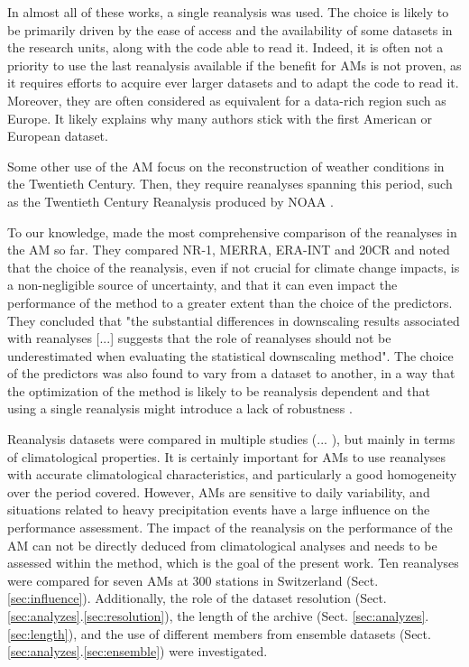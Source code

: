 \documentclass{ametsoc}
\begin{document}
In almost all of these works, a single reanalysis was used. The choice is likely to be primarily driven by the ease of access and the availability of some datasets in the research units, along with the code able to read it. Indeed, it is often not a priority to use the last reanalysis available if the benefit for AMs is not proven, as it requires efforts to acquire ever larger datasets and to adapt the code to read it. Moreover, they are often considered as equivalent for a data-rich region such as Europe. It likely explains why many authors stick with the first American or European dataset.

Some other use of the AM focus on the reconstruction of weather conditions in the Twentieth Century. Then, they require reanalyses spanning this period, such as the Twentieth Century Reanalysis \citep[20CR][]{Compo2011} produced by NOAA \citep[for example,][]{Kuentz2015, Caillouet2016, Brigode2016}. 

To our knowledge, \citet{Dayon2015} made the most comprehensive comparison of the reanalyses in the AM so far. They compared NR-1, MERRA, ERA-INT and 20CR and noted that the choice of the reanalysis, even if not crucial for climate change impacts, is a non-negligible source of uncertainty, and that it can even impact the performance of the method to a greater extent than the choice of the predictors. They concluded that "the substantial differences in downscaling results associated with reanalyses [...] suggests that the role of reanalyses should not be underestimated when evaluating the statistical downscaling method". The choice of the predictors was also found to vary from a dataset to another, in a way that the optimization of the method is likely to be reanalysis dependent and that using a single reanalysis might introduce a lack of robustness \citep{Dayon2015}.

Reanalysis datasets were compared in multiple studies (... ), but mainly in terms of climatological properties. It is certainly important for AMs to use reanalyses with accurate climatological characteristics, and particularly a good homogeneity over the period covered. However, AMs are sensitive to daily variability, and situations related to heavy precipitation events have a large influence on the performance assessment. The impact of the reanalysis on the performance of the AM can not be directly deduced from climatological analyses and needs to be assessed within the method, which is the goal of the present work. Ten reanalyses were compared for seven AMs at 300 stations in Switzerland (Sect. \ref{sec:influence}). Additionally, the role of the dataset resolution (Sect. \ref{sec:analyzes}.\ref{sec:resolution}), the length of the archive (Sect. \ref{sec:analyzes}.\ref{sec:length}), and the use of different members from ensemble datasets (Sect. \ref{sec:analyzes}.\ref{sec:ensemble}) were investigated.
\end{document}
